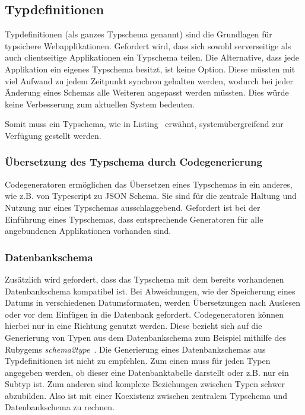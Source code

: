 \subsection{Typdefinitionen}

Typdefinitionen (als ganzes Typschema genannt) sind die Grundlagen für typsichere Webapplikationen.
Gefordert wird, dass sich sowohl serverseitige als auch clientseitige Applikationen ein Typschema teilen. 
Die Alternative, dass jede Applikation ein eigenes Typschema besitzt, ist keine Option. Diese müssten mit viel Aufwand zu jedem Zeitpunkt synchron gehalten werden, wodurch bei jeder Änderung eines Schemas alle Weiteren angepasst werden müssten. Dies würde keine Verbesserung zum aktuellen System bedeuten.

Somit muss ein Typschema, wie in Listing~ erwähnt, systemübergreifend zur Verfügung gestellt werden.

\subsubsection{Übersetzung des Typschema durch Codegenerierung}
Codegeneratoren ermöglichen das Übersetzen eines Typschemas in ein anderes, wie z.B. von Typescript zu JSON Schema.
Sie sind für die zentrale Haltung und Nutzung nur eines Typschemas ausschlaggebend.
Gefordert ist bei der Einführung eines Typschemas, dass entsprechende Generatoren für alle angebundenen Applikationen vorhanden sind.

\subsubsection{Datenbankschema}
Zusätzlich wird gefordert, dass das Typschema mit dem bereits vorhandenen Datenbankschema kompatibel ist.
Bei Abweichungen, wie der Speicherung eines Datums in verschiedenen Datumsformaten,
werden Übersetzungen nach Auslesen oder vor dem Einfügen in die Datenbank gefordert.
Codegeneratoren können hierbei nur in eine Richtung genutzt werden.
Diese bezieht sich auf die Generierung von Typen aus dem Datenbankschema zum Beispiel mithilfe des Rubygems \emph{schema2type}~\cite{schema2type}.
Die Generierung eines Datenbankschemas aus Typdefinitionen ist nicht zu empfehlen.
Zum einen muss für jeden Typen angegeben werden, ob dieser eine Datenbanktabelle darstellt oder z.B. nur ein Subtyp ist.
Zum anderen sind komplexe Beziehungen zwischen Typen schwer abzubilden.
Also ist mit einer Koexistenz zwischen zentralem Typschema und Datenbankschema zu rechnen.

